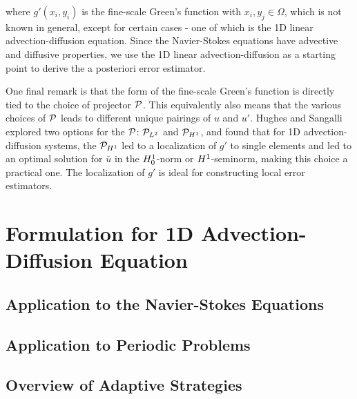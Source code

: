 \noindent where $g'(x_i,y_i)$ is the fine-scale Green's function with $x_i,y_j \in \Omega$, which is not known in general, except for certain cases - one of which is the 1D linear advection-diffusion equation.
Since the Navier-Stokes equations have advective and diffusive properties, we use the 1D linear advection-diffusion as a starting point to derive the a posteriori error estimator.

One final remark is that the form of the fine-scale Green's function is directly tied to the choice of projector $\mathcal{P}$.
This equivalently also means that the various choices of $\mathcal{P}$ leads to different unique pairings of $u$ and $u'$.
Hughes and Sangalli \cite{hughes2007variational} explored two options for the $\mathcal{P}$: $\mathcal{P}_{L^2}$ and $\mathcal{P}_{H^1}$, and found that for 1D advection-diffusion systems, the $\mathcal{P}_{H^1}$ led to a localization of $g'$ to single elements and led to an optimal solution for $\bar{u}$ in the $H^{1}_0$-norm or $H^{1}$-seminorm, making this choice a practical one.
The localization of $g'$ is ideal for constructing local error estimators.

\section{Formulation for 1D Advection-Diffusion Equation}

\label{sec:1D_AD}

\subsection{Application to the Navier-Stokes Equations}


\subsection{Application to Periodic Problems}

\label{sec:app_to_periodic}

\subsection{Overview of Adaptive Strategies}

\label{sec:adapt_strat_overview}






